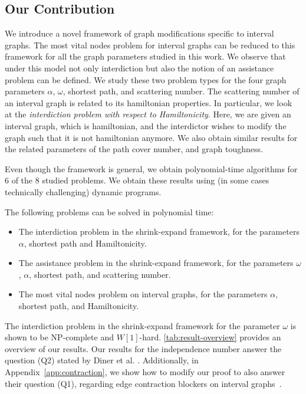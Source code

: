 
\subsection{Our Contribution} 
We introduce a novel framework of graph modifications  
specific to interval graphs. The most vital nodes problem for interval graphs can be reduced to  this framework for all the graph parameters studied in this work. We observe that under this model not only interdiction but also the 
notion of an assistance problem can be defined. 
We study these two problem types for the four graph parameters $\alpha$, $\omega$, shortest path, and scattering number. The scattering number of an interval graph is related to its hamiltonian properties. In particular, we look at the \emph{interdiction problem with respect to Hamiltonicity}. Here, we are given an interval graph, which is hamiltonian, and the interdictor wishes to modify the graph such that it is not hamiltonian anymore.
We also obtain similar results for the related parameters of the path cover number, and graph toughness.

Even though the framework is general, we obtain polynomial-time algorithms
for 6 of the 8 studied problems. We obtain these results using (in some cases technically challenging) dynamic programs. 

\begin{theorem}
The following problems can be solved in polynomial time:
\begin{itemize}
\item The interdiction problem in the shrink-expand framework, for the parameters $\alpha$,  shortest path and Hamiltonicity.
\item The assistance problem in the shrink-expand framework, for the parameters $\omega$, $\alpha$, shortest path, and scattering number.
\item The most vital nodes problem on interval graphs, for the parameters $\alpha$, shortest path, and Hamiltonicity.
\end{itemize}
\end{theorem}

The interdiction problem in the shrink-expand framework for the parameter $\omega$ is shown to be NP-complete and $W[1]$-hard. \cref{tab:result-overview} provides an overview of our results. 
Our results for the independence number answer the question (Q2) stated by Diner et al. \cite[(Q2)]{diner2018contractionDeletionBlockers}. Additionally, in Appendix~\ref{app:contraction}, we show how to modify our proof to also answer their question (Q1), regarding edge contraction blockers on interval graphs~\cite[(Q1)]{diner2018contractionDeletionBlockers}.

